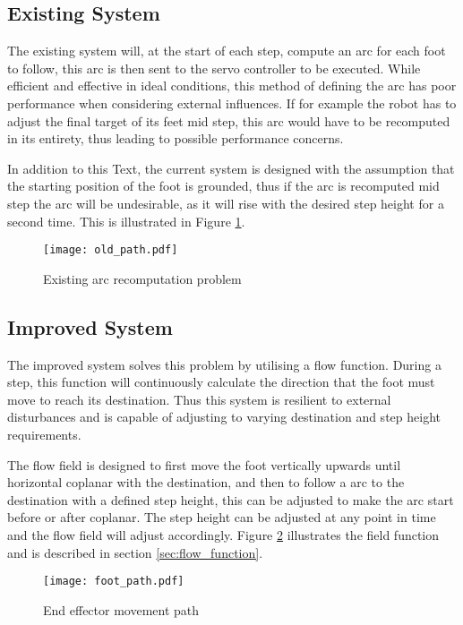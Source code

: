     \subsection{Existing System}
        The existing system will, at the start of each step, compute an arc for each foot to follow, this arc is then sent to the servo controller
        to be executed. While efficient and effective in ideal conditions, this method of defining the arc has poor performance when considering external
        influences. If for example the robot has to adjust the final target of its feet mid step, this arc would have to be recomputed in its entirety,
        thus leading to possible performance concerns.

        In addition to this Text, the current system is designed with the assumption that the starting position of the foot is grounded, thus if the arc is recomputed
        mid step the arc will be undesirable, as it will rise with the desired step height for a second time. This is illustrated in Figure \ref{fig:old_arc}.

        \begin{figure}[h]
            \centering
            \hspace{-1.38cm}
            \texttt{[image: old\_path.pdf]}
            \caption{Existing arc recomputation problem}
            \label{fig:old_arc}
        \end{figure}

    \subsection{Improved System}
        The improved system solves this problem by utilising a flow function. During a step, this function will continuously calculate the
        direction that the foot must move to reach its destination. Thus this system is resilient to external disturbances and is capable of adjusting to
        varying destination and step height requirements. 
        
        The flow field is designed to first move the foot vertically upwards until horizontal coplanar with the destination, and then to follow a
        arc to the destination with a defined step height, this can be adjusted to make the arc start before or after coplanar. The step height can be adjusted at any point in time and the flow field will adjust accordingly.
        Figure \ref{fig:foot_arc} illustrates the field function and is described in section \ref{sec:flow_function}.
        \begin{figure}[h]
            \centering
            \hspace{-1.38cm}
            \texttt{[image: foot\_path.pdf]}
            \caption{End effector movement path}
            \label{fig:foot_arc}
        \end{figure}

